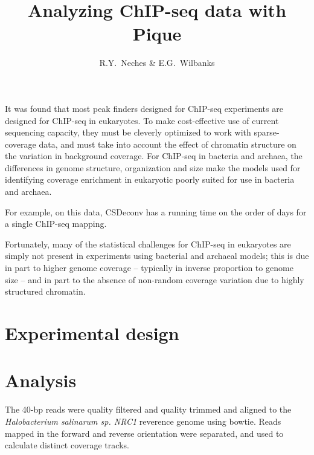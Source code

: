 \documentclass{article}
\author{R.Y.~Neches \& E.G.~Wilbanks}
\title{Analyzing ChIP-seq data with Pique}
\begin{document}
\maketitle

\newcommand{\imsize}{0.45\columnwidth}
\newcommand{\threeup}{0.26\columnwidth}
\newcommand{\cotwo}{$\text{CO}_{2}$}
\newcommand{\htwo}{$\text{H}_2$}
\newcommand{\otwo}{$\text{O}_2$}
\newcommand{\water}{$\text{H}_2\text{O}$}
\newcommand{\htwos}{$\text{H}_2\text{S}$}

\begin{abstract}
\end{abstract}

It was found that most peak finders designed for ChIP-seq experiments
are designed for ChIP-seq in eukaryotes. To make cost-effective use of
current sequencing capacity, they must be cleverly optimized to work
with sparse-coverage data, and must take into account the effect of
chromatin structure on the variation in background coverage. For
ChIP-seq in bacteria and archaea, the differences in genome structure,
organization and size make the models used for identifying coverage
enrichment in eukaryotic poorly suited for use in bacteria and
archaea. 

For example, on this data, CSDeconv has a running time on the order of
days for a single ChIP-seq mapping.


Fortunately, many of the statistical challenges for ChIP-seq in
eukaryotes are simply not present in experiments using bacterial and
archaeal models; this is due in part to higher genome coverage --
typically in inverse proportion to genome size -- and in part to the
absence of non-random coverage variation due to highly structured
chromatin.

\section{Experimental design}



\section{Analysis}


The 40-bp reads were quality filtered and quality trimmed and aligned
to the {\em Halobacterium salinarum sp. NRC1} reverence genome using
bowtie. Reads mapped in the forward and reverse orientation were
separated, and used to calculate distinct coverage tracks.
\end{document}
